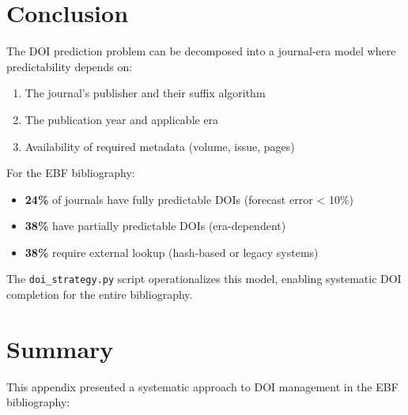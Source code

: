 \section{Conclusion}
\label{sec:conclusion}

The DOI prediction problem can be decomposed into a journal-era model where predictability depends on:

\begin{enumerate}
    \item The journal's publisher and their suffix algorithm
    \item The publication year and applicable era
    \item Availability of required metadata (volume, issue, pages)
\end{enumerate}

For the EBF bibliography:
\begin{itemize}
    \item \textbf{24\%} of journals have fully predictable DOIs (forecast error < 10\%)
    \item \textbf{38\%} have partially predictable DOIs (era-dependent)
    \item \textbf{38\%} require external lookup (hash-based or legacy systems)
\end{itemize}

The \texttt{doi\_strategy.py} script operationalizes this model, enabling systematic DOI completion for the entire bibliography.

\section{Summary}
\label{sec:summary}

This appendix presented a systematic approach to DOI management in the EBF bibliography:

